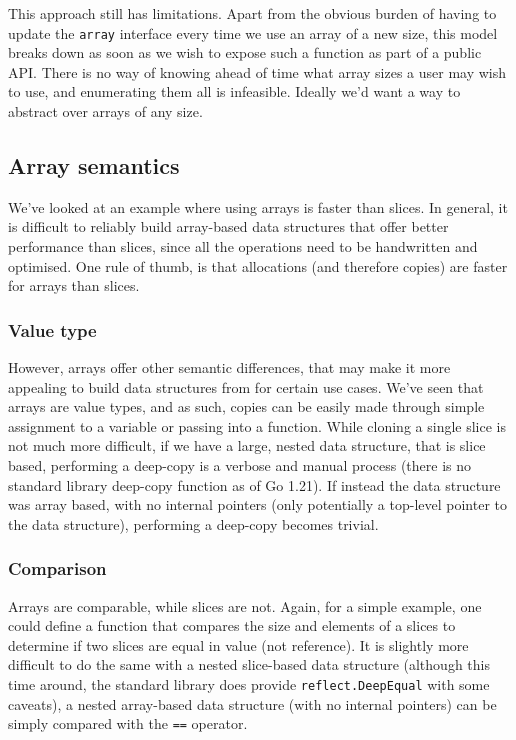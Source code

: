 
This approach still has limitations. Apart from the obvious burden of having to
update the \texttt{array} interface every time we use an array of a new size,
this model breaks down as soon as we wish to expose such a function as part of a
public API. There is no way of knowing ahead of time what array sizes a user may
wish to use, and enumerating them all is infeasible. Ideally we'd want a way to
abstract over arrays of any size.


\subsection{Array semantics}


We've looked at an example where using arrays is faster than slices. In general,
it is difficult to reliably build array-based data structures that offer better
performance than slices, since all the operations need to be handwritten and
optimised. One rule of thumb, is that allocations (and therefore copies) are
faster for arrays than slices.

\subsubsection{Value type}

However, arrays offer other semantic differences, that may make it more
appealing to build data structures from for certain use cases. We've seen that
arrays are value types, and as such, copies can be easily made through simple
assignment to a variable or passing into a function. While cloning a single
slice is not much more difficult, if we have a large, nested data structure,
that is slice based, performing a deep-copy is a verbose and manual process
(there is no standard library deep-copy function as of Go 1.21). If instead the
data structure was array based, with no internal pointers (only potentially a
top-level pointer to the data structure), performing a deep-copy becomes
trivial.

\subsubsection{Comparison}

Arrays are comparable, while slices are not. Again, for a simple example, one
could define a function that compares the size and elements of a slices to
determine if two slices are equal in value (not reference). It is slightly more
difficult to do the same with a nested slice-based data structure (although this
time around, the standard library does provide \texttt{reflect.DeepEqual} with
some caveats),
a nested array-based data structure (with no internal pointers) can be simply
compared with the \texttt{==} operator.

